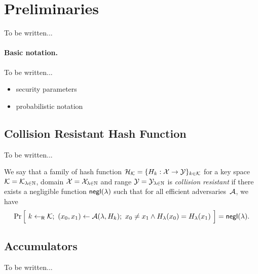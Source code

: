 \section{Preliminaries}

To be written...

\paragraph{Basic notation.}
\label{sec:notation}

To be written...
\begin{itemize}[noitemsep]
    \item security parameters
    \item probabilistic notation
\end{itemize}

\subsection{Collision Resistant Hash Function}

To be written...

\newcommand{\getsr}{\gets_{\ms{R}}}

\begin{definition}
    We say that a family of hash function $\mathcal{H}_{\mathcal{K}} = \{ H_k: \mathcal{X} \to
    \mathcal{Y} \}_{k \in \mathcal{K}}$ for a key space $\mathcal{K} = \mathcal{K}_{\lambda \in \mathbb{N}}$,
    domain $\mathcal{X} = \mathcal{X}_{\lambda \in \mathbb{N}}$ and range $\mathcal{Y} = \mathcal{Y}_{\lambda
    \in \mathbb{N}}$ is \emph{collision resistant} if there exists a negligible
    function $\mathsf{negl}(\lambda)$ such that for all efficient adversaries~$\mathcal{A}$,
    we have
    \[ \Pr\Big[~ k \getsr \calK;~ (x_0, x_1) \gets \calA(\lambda, H_k);~
    x_0 \neq x_1 \land H_\lambda(x_0) = H_\lambda(x_1) ~\Big] = \negl(\lambda)
.\]
\end{definition}

\subsection{Accumulators}

To be written...

\newcommand{\Piacc}{\Pi_\ms{acc}}

